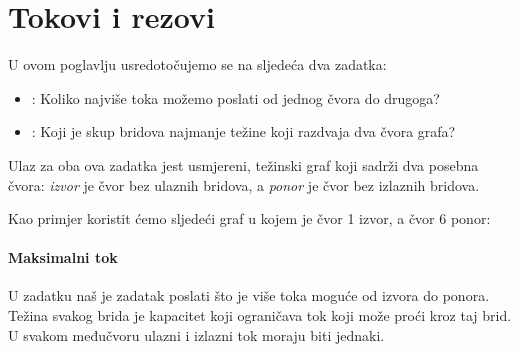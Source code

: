 \chapter{Tokovi i rezovi}

U ovom poglavlju usredotočujemo se na sljedeća
dva zadatka:

\begin{itemize}
\item {}:
Koliko najviše toka možemo
poslati od jednog čvora do drugoga?
\item {}:
Koji je skup bridova najmanje težine
koji razdvaja dva čvora grafa?
\end{itemize}

Ulaz za oba ova zadatka jest usmjereni,
težinski graf koji sadrži dva posebna čvora:
\emph{izvor} je čvor bez ulaznih bridova,
a \emph{ponor} je čvor bez izlaznih bridova.

Kao primjer koristit ćemo sljedeći graf
u kojem je čvor 1 izvor, a čvor 6
ponor:

\begin{center}
\end{center}

\subsubsection{Maksimalni tok}


U zadatku 
naš je zadatak poslati što je više toka moguće
od izvora do ponora.
Težina svakog brida je kapacitet koji
ograničava tok
koji može proći kroz taj brid.
U svakom međučvoru
ulazni i izlazni
tok moraju biti jednaki.

